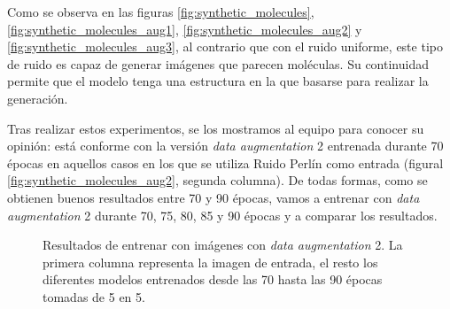 Como se observa en las figuras \ref{fig:synthetic_molecules}, \ref{fig:synthetic_molecules_aug1}, \ref{fig:synthetic_molecules_aug2} y \ref{fig:synthetic_molecules_aug3}, al contrario que con el ruido uniforme, este tipo de ruido es capaz de generar imágenes que parecen moléculas. Su continuidad permite que el modelo tenga una estructura en la que basarse para realizar la generación. 

Tras realizar estos experimentos, se los mostramos al equipo para conocer su opinión: está conforme con la versión \textit{data augmentation} 2 entrenada durante 70 épocas en aquellos casos en los que se utiliza Ruido Perlín como entrada (figural \ref{fig:synthetic_molecules_aug2}, segunda columna). De todas formas, como se obtienen buenos resultados entre 70 y 90 épocas, vamos a entrenar con \textit{data augmentation} 2 durante 70, 75, 80, 85 y 90 épocas y a comparar los resultados.

\begin{figure}[H]
\centering
    \caption{Resultados de entrenar con imágenes con \textit{data augmentation} 2. La primera columna representa la imagen de entrada, el resto los diferentes modelos entrenados desde las 70 hasta las 90 épocas tomadas de 5 en 5.}
    \label{fig:synthetic_molecules_aug2_extra} 
\end{figure}

